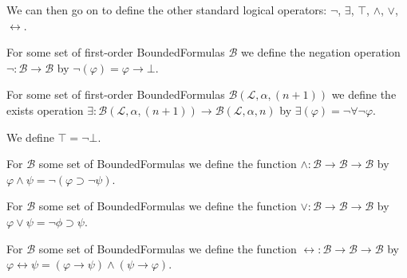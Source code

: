 We can then go on to define the other standard logical operators: $\neg$, $\exists$, $\top$, $\wedge$, $\vee$, $\leftrightarrow$.
\begin{definition}\label{def:FO-Neg}
  \leanok
  For some set of first-order BoundedFormulas $\mathcal{B}$ we define the negation operation $\neg : \mathcal{B} \to \mathcal{B}$ by $\neg(\varphi) = \varphi \rightarrow \bot$.
\end{definition}

\begin{definition}\label{def:FO-Ex}
  \leanok
  For some set of first-order BoundedFormulas $\mathcal{B}(\mathcal{L},\alpha,(n+1))$ we define the exists operation $\exists : \mathcal{B}(\mathcal{L},\alpha,(n + 1)) \to \mathcal{B}(\mathcal{L},\alpha,n)$ by $\exists(\varphi) = \neg \forall \neg \varphi$.
\end{definition}

\begin{definition}\label{def:Top}
  \leanok
  We define $\top = \neg \bot$.
\end{definition}

\begin{definition}\label{def:FO-And}
  \leanok
  For $\mathcal{B}$ some set of BoundedFormulas we define the function $\wedge : \mathcal{B} \to \mathcal{B} \to \mathcal{B}$ by $\varphi \wedge \psi = \neg (\varphi \supset \neg \psi)$.
\end{definition}

\begin{definition}[$\vee$ : Or]\label{def:FO-Or}
  \leanok
  For $\mathcal{B}$ some set of BoundedFormulas we define the function $\vee : \mathcal{B} \to \mathcal{B} \to \mathcal{B}$ by $\varphi \vee \psi = \neg \phi \supset \psi$.
\end{definition}

\begin{definition}\label{def:FO-Iff}
  \leanok
  For $\mathcal{B}$ some set of BoundedFormulas we define the function $\leftrightarrow : \mathcal{B} \to \mathcal{B} \to \mathcal{B}$ by $\varphi \leftrightarrow \psi = (\varphi \to \psi) \wedge (\psi \to \varphi)$.
\end{definition}

